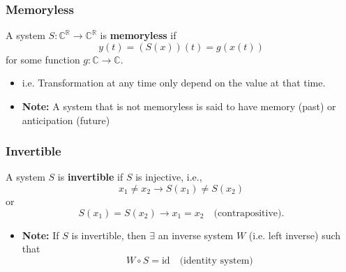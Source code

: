     \subsubsection{Memoryless}
    \begin{definition}
        A system \( S: \mathbb{C}^{\mathbb{R}} \to \mathbb{C}^{\mathbb{R}} \) is \textbf{memoryless} if
        \begin{equation}
            y(t) = (S(x))(t) = g(x(t))
        \end{equation}
        for some function \( g: \mathbb{C} \to \mathbb{C} \).
        \begin{itemize}
            \item i.e. Transformation at any time only depend on the value at that time.
            \item \textbf{Note:} A system that is not memoryless is said to have memory (past) or anticipation (future)
        \end{itemize}
    \end{definition}

    \begin{example}

    \end{example}

    \subsubsection{Invertible}
    \begin{definition}
        A system \( S \) is \textbf{invertible} if \( S \) is injective, i.e.,
        \[
        x_1 \neq x_2 \rightarrow S(x_1) \neq S(x_2)
        \]
        or
        \[
        S(x_1) = S(x_2) \rightarrow x_1 = x_2 \quad \text{(contrapositive)}.
        \]

        \begin{itemize}
            \item \textbf{Note:} If \( S \) is invertible, then \( \exists \) an inverse system \( W \) (i.e. left inverse) such that
            \[
            W \circ S = \text{id} \quad \text{(identity system)}
            \]
        \end{itemize}
    \end{definition}


